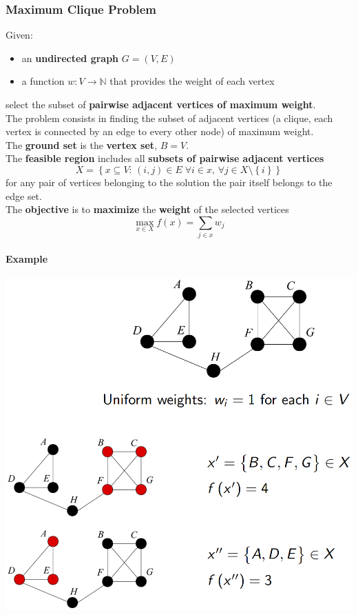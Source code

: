 \newpage

\subsubsection{Maximum Clique Problem}
Given:
\begin{itemize}
	\item an \textbf{undirected graph} $G = (V , E )$
	\item a function $w : V \rightarrow \mathbb{N}$ that provides the weight of each vertex
\end{itemize}
select the subset of \textbf{pairwise adjacent vertices of maximum weight}.\\
The problem consists in finding the subset of adjacent vertices (a clique, each vertex is connected by an edge to every other node) of maximum weight.\\

The \textbf{ground set} is the \textbf{vertex set}, $B = V$.\\

The \textbf{feasible region} includes all \textbf{subsets of pairwise adjacent vertices}
$$ X = \left\{x \subseteq V : \, (i,j) \in E \; \forall i \in x, \, \forall j \in X \setminus \left\{i\right\}\right\}$$
for any pair of vertices belonging to the solution the pair itself belongs to the edge set.\\

The \textbf{objective} is to \textbf{maximize} the \textbf{weight} of the selected vertices
$$ \max_{x \in X} f(x) = \sum_{j \in x} w_j $$

\newpage

\paragraph{Example}
\begin{center}
	\includegraphics[width=\columnwidth]{img/MCP1}
\end{center}

